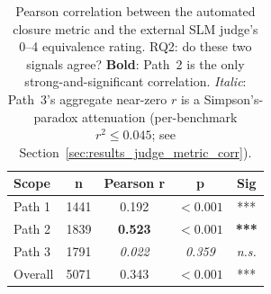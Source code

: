 \begin{table}[!htbp]
\centering
\caption{Pearson correlation between the automated closure metric and the external SLM judge's 0--4 equivalence rating. RQ2: do these two signals agree? \textbf{Bold}: Path~2 is the only strong-and-significant correlation. \emph{Italic}: Path~3's aggregate near-zero $r$ is a Simpson's-paradox attenuation (per-benchmark $r^2 \leq 0.045$; see Section~\ref{sec:results_judge_metric_corr}).}
\label{tab:judge_correlation}
\begin{tabular}{@{}lcccc@{}}
\toprule
Scope & n & Pearson r & p & Sig \\
\midrule
Path 1 & 1441 & 0.192 & $<0.001$ & *** \\
Path 2 & 1839 & \textbf{0.523} & $<0.001$ & \textbf{***} \\
Path 3 & 1791 & \emph{0.022} & \emph{0.359} & \emph{n.s.} \\
Overall & 5071 & 0.343 & $<0.001$ & *** \\
\bottomrule
\end{tabular}
\end{table}
